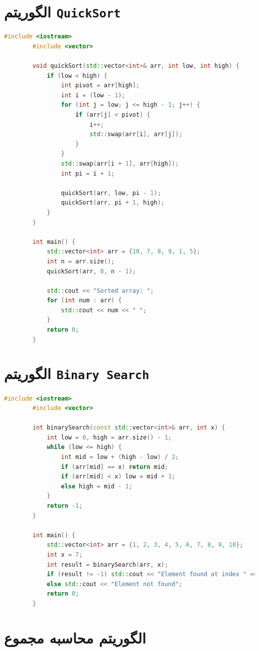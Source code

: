 \documentclass[12pt, a4paper]{report}
\begin{document}
\section{الگوریتم \texttt{QuickSort}}
\begin{LTR}
	\begin{lstlisting}[language=C++, breaklines=true]
		#include <iostream>
		#include <vector>
		
		void quickSort(std::vector<int>& arr, int low, int high) {
			if (low < high) {
				int pivot = arr[high];
				int i = (low - 1);
				for (int j = low; j <= high - 1; j++) {
					if (arr[j] < pivot) {
						i++;
						std::swap(arr[i], arr[j]);
					}
				}
				std::swap(arr[i + 1], arr[high]);
				int pi = i + 1;
				
				quickSort(arr, low, pi - 1);
				quickSort(arr, pi + 1, high);
			}
		}
		
		int main() {
			std::vector<int> arr = {10, 7, 8, 9, 1, 5};
			int n = arr.size();
			quickSort(arr, 0, n - 1);
			
			std::cout << "Sorted array: ";
			for (int num : arr) {
				std::cout << num << " ";
			}
			return 0;
		}
	\end{lstlisting}
\end{LTR}


\section{الگوریتم \texttt{Binary Search}}
\begin{LTR}
	\begin{lstlisting}[language=C++, breaklines=true]
		#include <iostream>
		#include <vector>
		
		int binarySearch(const std::vector<int>& arr, int x) {
			int low = 0, high = arr.size() - 1;
			while (low <= high) {
				int mid = low + (high - low) / 2;
				if (arr[mid] == x) return mid;
				if (arr[mid] < x) low = mid + 1;
				else high = mid - 1;
			}
			return -1;
		}
		
		int main() {
			std::vector<int> arr = {1, 2, 3, 4, 5, 6, 7, 8, 9, 10};
			int x = 7;
			int result = binarySearch(arr, x);
			if (result != -1) std::cout << "Element found at index " << result;
			else std::cout << "Element not found";
			return 0;
		}
	\end{lstlisting}
\end{LTR}

\section{الگوریتم محاسبه مجموع}
\end{document}
